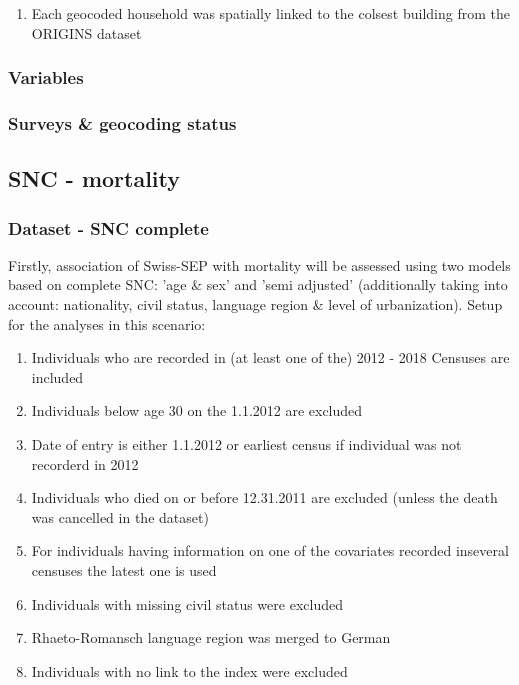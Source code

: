 \documentclass[a4paper, notitlepage, fleqn]{article} %
\begin{document}
{\begin{enumerate}
	\item Each geocoded household was spatially linked to the colsest building from the ORIGINS dataset 
\end{enumerate}
\subsubsection{Variables}
\begin{stlog}\end{stlog}
\subsubsection{Surveys \& geocoding status}
\begin{stlog}\end{stlog}
\newpage
\subsection{SNC - mortality}
\subsubsection{Dataset - SNC complete}

Firstly, association of Swiss-SEP with mortality will be assessed using two models based on complete SNC: 
'age \& sex' and 'semi adjusted'  
(additionally taking into account: nationality, civil status, language region \& level of urbanization). Setup for the analyses in this scenario: 
\begin{enumerate}

	\item Individuals who are recorded in (at least one of the) 2012 - 2018 Censuses are included
	\item Individuals below age 30 on the 1.1.2012 are excluded
	\item Date of entry is either 1.1.2012 or earliest census if individual was not recorderd in 2012
	\item Individuals who died on or before 12.31.2011 are excluded (unless the death was cancelled in the dataset)
	\item For individuals having information on one of the covariates recorded inseveral censuses the latest one is used
	\item Individuals with missing civil status were excluded
	\item Rhaeto-Romansch language region was merged to German
	\item Individuals with no link to the index were excluded
	

\end{enumerate}}
\end{document}
